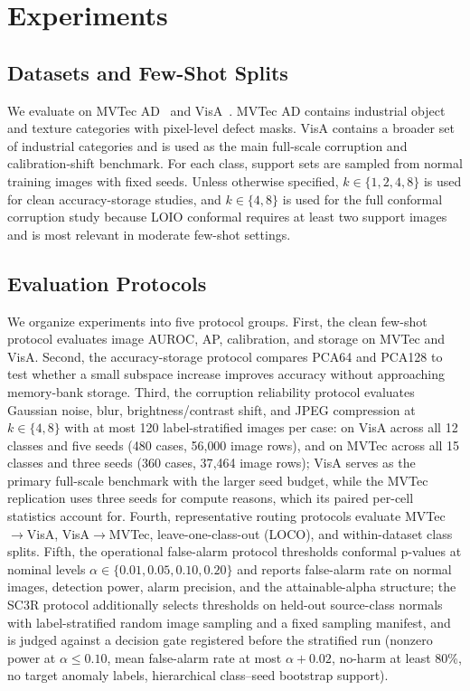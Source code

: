 \section{Experiments}\label{sec:experiments}
\subsection{Datasets and Few-Shot Splits}
We evaluate on MVTec AD~\cite{mvtec2019} and VisA~\cite{visa2022}. MVTec AD contains industrial object and texture categories with pixel-level defect masks. VisA contains a broader set of industrial categories and is used as the main full-scale corruption and calibration-shift benchmark. For each class, support sets are sampled from normal training images with fixed seeds. Unless otherwise specified, $k\in\{1,2,4,8\}$ is used for clean accuracy-storage studies, and $k\in\{4,8\}$ is used for the full conformal corruption study because LOIO conformal requires at least two support images and is most relevant in moderate few-shot settings.

\subsection{Evaluation Protocols}
We organize experiments into five protocol groups. First, the clean few-shot protocol evaluates image AUROC, AP, calibration, and storage on MVTec and VisA. Second, the accuracy-storage protocol compares PCA64 and PCA128 to test whether a small subspace increase improves accuracy without approaching memory-bank storage. Third, the corruption reliability protocol evaluates Gaussian noise, blur, brightness/contrast shift, and JPEG compression at $k\in\{4,8\}$ with at most 120 label-stratified images per case: on VisA across all 12 classes and five seeds (480 cases, 56{,}000 image rows), and on MVTec across all 15 classes and three seeds (360 cases, 37{,}464 image rows); VisA serves as the primary full-scale benchmark with the larger seed budget, while the MVTec replication uses three seeds for compute reasons, which its paired per-cell statistics account for. Fourth, representative routing protocols evaluate MVTec$\rightarrow$VisA, VisA$\rightarrow$MVTec, leave-one-class-out (LOCO), and within-dataset class splits. Fifth, the operational false-alarm protocol thresholds conformal p-values at nominal levels $\alpha\in\{0.01,0.05,0.10,0.20\}$ and reports false-alarm rate on normal images, detection power, alarm precision, and the attainable-alpha structure; the SC3R protocol additionally selects thresholds on held-out source-class normals with label-stratified random image sampling and a fixed sampling manifest, and is judged against a decision gate registered before the stratified run (nonzero power at $\alpha\le0.10$, mean false-alarm rate at most $\alpha{+}0.02$, no-harm at least 80\%, no target anomaly labels, hierarchical class--seed bootstrap support).

